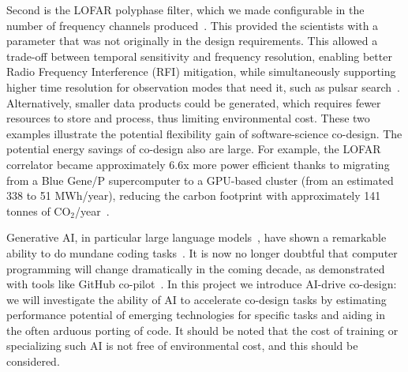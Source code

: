 \documentclass[a4wide,twocolumn]{article}
\begin{document}
Second is the LOFAR polyphase filter, which we made configurable in the number of frequency channels produced~\cite{Romein:11a}. This provided the scientists with a parameter that was not originally in the design requirements. This allowed a trade-off between temporal sensitivity and frequency resolution, enabling better Radio Frequency Interference (RFI) mitigation, while simultaneously supporting higher time resolution for observation modes that need it, such as pulsar search~\cite{van2016towards,van2018real,levin2017pulsar,sclocco2013pulsar,sclocco2014real,sclocco2015finding}. 
Alternatively, smaller data products could be generated, which requires fewer resources to store and process, thus limiting environmental cost. 
These two examples illustrate the potential flexibility gain of software-science co-design. 
The potential energy savings of co-design also are large. 
For example, the LOFAR correlator became approximately 6.6x more power efficient thanks to migrating from a Blue Gene/P supercomputer to a GPU-based cluster (from an estimated 338 to 51 MWh/year), reducing the carbon footprint with approximately 141 tonnes of CO$_2$/year~\cite{kruithof_energy_2023}.

Generative AI, in particular large language models~\cite{wu_autogen_2023,brown_language_2020,wei2022emergent}, have shown a remarkable ability to do mundane coding tasks~\cite{godoy_evaluation_2023}. 
It is now no longer doubtful that computer programming will change dramatically in the coming decade, as demonstrated with tools like GitHub co-pilot~\cite{nguyen_empirical_2022}. 
In this project we introduce AI-drive co-design: we will investigate the ability of AI to accelerate co-design tasks by estimating performance potential of emerging technologies for specific tasks and aiding in the often arduous porting of code. 
It should be noted that the cost of training or specializing such AI is not free of environmental cost, and this should be considered.
\end{document}
